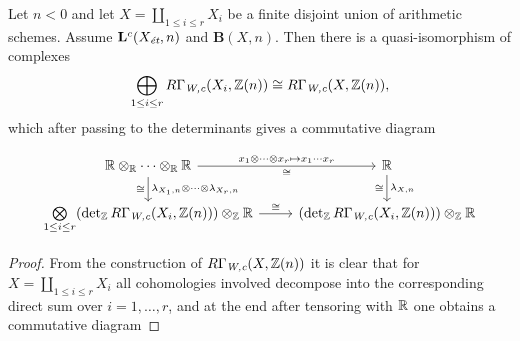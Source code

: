 \documentclass{article}
\numberwithin{equation}{section}
\begin{document}
\begin{lemma}
  \label{lemma:lambda-and-disjoint-unions}
  Let $n < 0$ and let $X = \coprod_{1 \le i \le r} X_i$ be a finite disjoint
  union of arithmetic schemes. Assume $\mathbf{L}^c (X_\et,n)$ and
  $\mathbf{B} (X,n)$. Then there is a quasi-isomorphism of complexes
  \[ \bigoplus_{1 \le i \le r} R\Gamma_\Wc (X_i, \ZZ(n)) \cong
    R\Gamma_\Wc (X, \ZZ(n)), \]
  which after passing to the determinants gives a commutative diagram

  \begin{equation}
    \label{eqn:lambda-and-disjoint-unions}
    \begin{tikzcd}
      \RR \otimes_\RR \cdots \otimes_\RR \RR\ar{d}{\lambda_{X_1,n}\otimes\cdots\otimes\lambda_{X_r,n}}[swap]{\cong} \ar{r}{x_1\otimes\cdots\otimes x_r \mapsto x_1\cdots x_r}[swap]{\cong} & \RR \ar{d}{\lambda_{X,n}}[swap]{\cong} \\
      \bigotimes\limits_{1 \le i \le r} (\det_\ZZ R\Gamma_\Wc (X_i, \ZZ(n))) \otimes_\ZZ \RR \ar{r}{\cong} & (\det_\ZZ R\Gamma_\Wc (X_i, \ZZ(n))) \otimes_\ZZ \RR
    \end{tikzcd}
  \end{equation}

  \begin{proof}
    From the construction of $R\Gamma_\Wc (X, \ZZ(n))$ it is clear that for
    $X = \coprod_{1 \le i \le r} X_i$ all cohomologies involved decompose into
    the corresponding direct sum over $i = 1,\ldots,r$, and at the end after
    tensoring with $\RR$ one obtains a commutative diagram


\end{proof}
\end{lemma}
\end{document}
